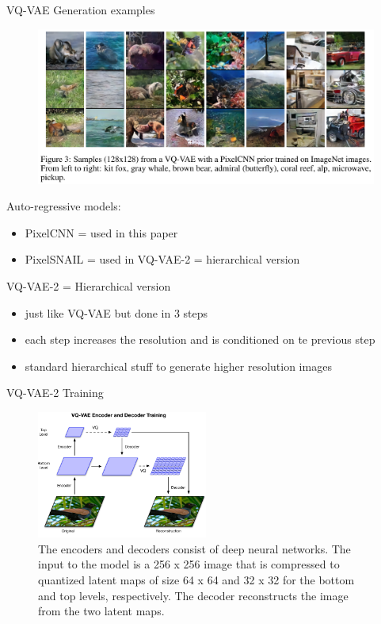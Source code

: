 \documentclass{beamer}
\begin{document}
\begin{frame}{VQ-VAE Generation examples}

\begin{figure}[h]
\includegraphics[width=\textwidth]{img/generated}
\end{figure}

Auto-regressive models:
\begin{itemize}
\item PixelCNN = used in this paper
\item PixelSNAIL \cite{snail} = used in VQ-VAE-2 = hierarchical version
\end{itemize}

\end{frame}
\begin{frame}{VQ-VAE-2 = Hierarchical version}

\begin{itemize}
\item just like VQ-VAE but done in 3 steps
\item each step increases the resolution and is conditioned on te previous step
\item standard hierarchical stuff to generate higher resolution images
\end{itemize}

\end{frame}
\begin{frame}{VQ-VAE-2 Training}

\begin{figure}[h]
\includegraphics[width=0.5\textwidth]{img/v2-train}
\caption{The encoders and decoders consist of deep neural networks. The input to the model is a 256 x 256 image that is compressed to quantized latent maps of size 64 x 64 and 32 x 32 for the bottom and top levels, respectively. The decoder reconstructs the image from the two latent maps.}
\end{figure}

\end{frame}
\end{document}
